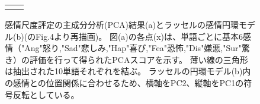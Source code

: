 
\begin{figure}[t]

  \begin{tabular}{cc}
  \begin{minipage} {0.47\hsize}
  \centering
  \includegraphics [ width = 1\columnwidth]{Figure/ExpAngHapSad/FigPCA_CumAll_scatter_SndTriangle_Eng.eps}
  \end{minipage} & 
  
  \begin{minipage} {0.47\hsize}
  \centering
  \includegraphics [ width = 1\columnwidth]{Figure/ExpAngHapSad/Fig_RusselCircle_b_JLabel.eps }
  \end{minipage}
  
  \end{tabular}
  
  \caption{感情尺度評定の主成分分析(PCA)結果(a)とラッセルの感情円環モデル(b)(\cite{russell1980circumplex}のFig.4より再描画)。
            図(a)の各点(x)は、単語ごとに基本6感情（"Ang"怒り,"Sad"悲しみ,"Hap"喜び,"Fea"恐怖,"Dis"嫌悪,"Sur"驚き）の評価を行って得られたPCAスコアを示す。
            薄い線の三角形は抽出された10単語それぞれを結ぶ。
            ラッセルの円環モデル(b)内の感情との位置関係に合わせるため、横軸をPC2、縦軸をPC1の符号反転としている。
            }
  \label{fig:PCA-Russel_AngHapSad} 

\end{figure}

